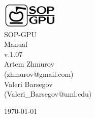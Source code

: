 \documentclass[a4paper]{article}
\begin{document}
\begin{titlepage}

\begin{center}

\includegraphics[width=0.20\textwidth]{SOPGPULogo-bw}\\[3cm] 

{\Huge SOP-GPU}\\[0.5cm]
{\Large Manual}\\[0.2cm]
{\large v.1.07}\\[1.8cm]

{\large Artem Zhmurov}\\
{\small (zhmurov@gmail.com)}\\[1.0cm]

{\large Valeri Barsegov}\\
{\small (Valeri\_Barsegov@uml.edu)}

\vfill

{\large \today}

\end{center}

\end{titlepage}
\end{document}
